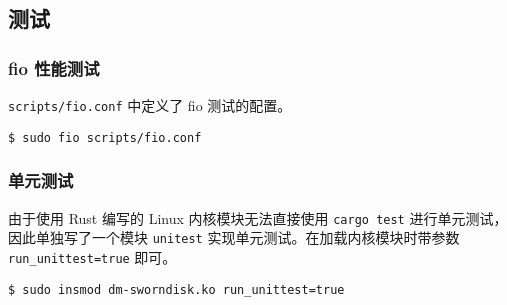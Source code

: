 \subsection{测试}

\subsubsection{fio 性能测试}

\texttt{scripts/fio.conf} 中定义了 fio 测试的配置。

\begin{verbatim}
$ sudo fio scripts/fio.conf
\end{verbatim}

\subsubsection{单元测试}

由于使用 Rust 编写的 Linux 内核模块无法直接使用 \texttt{cargo test} 进行单元测试，因此单独写了一个模块 \texttt{unitest} 实现单元测试。在加载内核模块时带参数 \texttt{run_unittest=true} 即可。

\begin{verbatim}
$ sudo insmod dm-sworndisk.ko run_unittest=true
\end{verbatim}